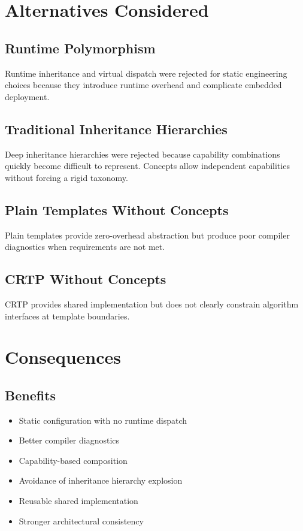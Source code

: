 \documentclass[11pt]{article}
\begin{document}
\section{Alternatives Considered}

\subsection{Runtime Polymorphism}

Runtime inheritance and virtual dispatch were rejected for static engineering
choices because they introduce runtime overhead and complicate embedded
deployment.

\subsection{Traditional Inheritance Hierarchies}

Deep inheritance hierarchies were rejected because capability combinations
quickly become difficult to represent. Concepts allow independent capabilities
without forcing a rigid taxonomy.

\subsection{Plain Templates Without Concepts}

Plain templates provide zero-overhead abstraction but produce poor compiler
diagnostics when requirements are not met.

\subsection{CRTP Without Concepts}

CRTP provides shared implementation but does not clearly constrain algorithm
interfaces at template boundaries.

\section{Consequences}

\subsection{Benefits}

\begin{itemize}
    \item Static configuration with no runtime dispatch
    \item Better compiler diagnostics
    \item Capability-based composition
    \item Avoidance of inheritance hierarchy explosion
    \item Reusable shared implementation
    \item Stronger architectural consistency
\end{itemize}
\end{document}
